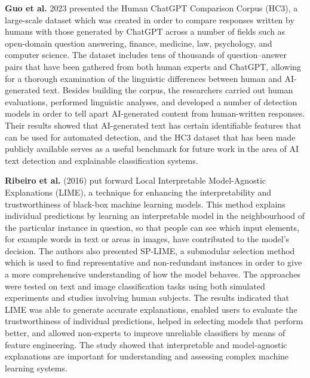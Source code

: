 \documentclass[conference]{IEEEtran}
\begin{document}
 \textbf{Guo et al.} 2023 presented the Human ChatGPT Comparison Corpus (HC3), a large-scale dataset which was created in order to compare responses written by humans with those generated by ChatGPT across a number of fields such as open-domain question answering, finance, medicine, law, psychology, and computer science. The dataset includes tens of thousands of question–answer pairs that have been gathered from both human experts and ChatGPT, allowing for a thorough examination of the linguistic differences between human and AI-generated text. Besides building the corpus, the researchers carried out human evaluations, performed linguistic analyses, and developed a number of detection models in order to tell apart AI-generated content from human-written responses. Their results showed that AI-generated text has certain identifiable features that can be used for automated detection, and the HC3 dataset that has been made publicly available serves as a useful benchmark for future work in the area of AI text detection and explainable classification systems.

\textbf{Ribeiro et al. }(2016) put forward Local Interpretable Model-Agnostic Explanations (LIME), a technique for enhancing the interpretability and trustworthiness of black-box machine learning models. This method explains individual predictions by learning an interpretable model in the neighbourhood of the particular instance in question, so that people can see which input elements, for example words in text or areas in images, have contributed to the model's decision. The authors also presented SP-LIME, a submodular selection method which is used to find representative and non-redundant instances in order to give a more comprehensive understanding of how the model behaves. The approaches were tested on text and image classification tasks using both simulated experiments and studies involving human subjects. The results indicated that LIME was able to generate accurate explanations, enabled users to evaluate the trustworthiness of individual predictions, helped in selecting models that perform better, and allowed non-experts to improve unreliable classifiers by means of feature engineering. The study showed that interpretable and model-agnostic explanations are important for understanding and assessing complex machine learning systems.
\end{document}
